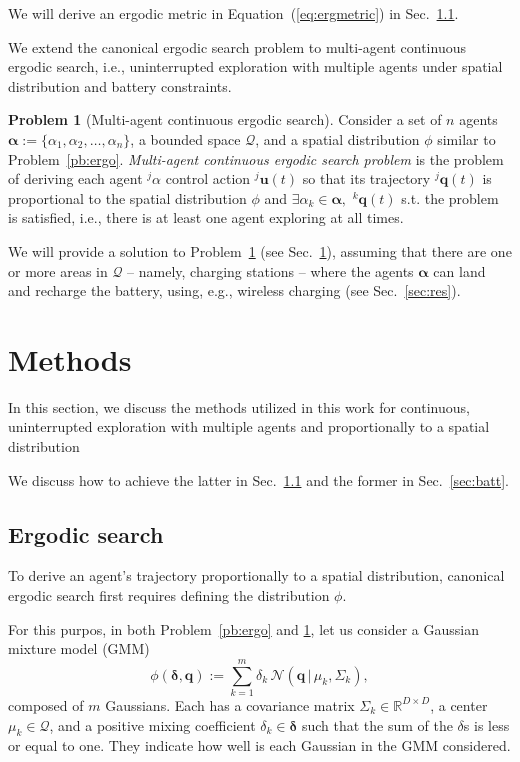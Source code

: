 \documentclass[letterpaper,10pt,conference,twoside]{IEEEtran}
\theoremstyle{definition}
\newtheorem{pb}{Problem}[section]
\begin{document}
We will derive an ergodic metric in Equation~(\ref{eq:ergmetric}) in Sec.~\ref{sec:ergosearch}.

We extend the canonical ergodic search problem to multi-agent continuous ergodic search, i.e., uninterrupted exploration with multiple agents under spatial distribution and battery constraints.

\begin{pb}[Multi-agent continuous ergodic search]\label{pb:enerergo}
  Consider a set of $n$ agents $\boldsymbol{\alpha}:=\{\alpha_1,\alpha_2,\dots,\alpha_n\}$, a bounded space $\mathcal{Q}$, and a spatial distribution $\phi$ similar to Problem~\ref{pb:ergo}. \textit{Multi-agent continuous ergodic search problem} is the problem of deriving each agent ${}^j\alpha$ control action ${}^j\mathbf{u}(t)$ so that its trajectory ${}^j\mathbf{q}(t)$ is proportional to the spatial distribution $\phi$ and %
  $\exists \alpha_k\in\boldsymbol{\alpha},\,\,{}^k\mathbf{q}(t)$ s.t. the problem is satisfied, i.e., there is at least one agent exploring at all times.
\end{pb}

We will provide a solution to Problem~\ref{pb:enerergo} (see Sec.~\ref{sec:meth}), assuming that there are one or more areas in $\mathcal{Q}$ -- namely, charging stations -- where the agents $\boldsymbol{\alpha}$ can land and recharge the battery, using, e.g., wireless charging (see Sec.~\ref{sec:res}). 


\section{Methods}\label{sec:meth}
\noindent
In this section, we discuss the methods utilized in this work for continuous, uninterrupted exploration with multiple agents and proportionally to a spatial distribution

We discuss how to achieve the latter in Sec.~\ref{sec:ergosearch} and the former in Sec.~\ref{sec:batt}.

\subsection{Ergodic search}\label{sec:ergosearch}
\noindent
To derive an agent's trajectory proportionally to a spatial distribution, canonical ergodic search first requires defining the distribution $\phi$.

For this purpos, in both Problem~\ref{pb:ergo} and \ref{pb:enerergo}, let us consider a Gaussian mixture model (GMM)
\begin{equation}\label{eq:gmm}
  \phi(\boldsymbol{\delta},\mathbf{q}):=\sum_{k=1}^{m}\delta_k\,\mathcal{N}(\mathbf{q}\,|\,\mu_k,\Sigma_k),
\end{equation} 
composed of $m$ Gaussians. Each has a covariance matrix ${\Sigma_k}\in\mathbb{R}^{D\times D}$, a center $\mu_k\in\mathcal{Q}$, and a positive mixing coefficient $\delta_k\in\boldsymbol{\delta}$ such that the sum of the $\delta$s is less or equal to one. They indicate how well is each Gaussian in the GMM considered. 
\end{document}
